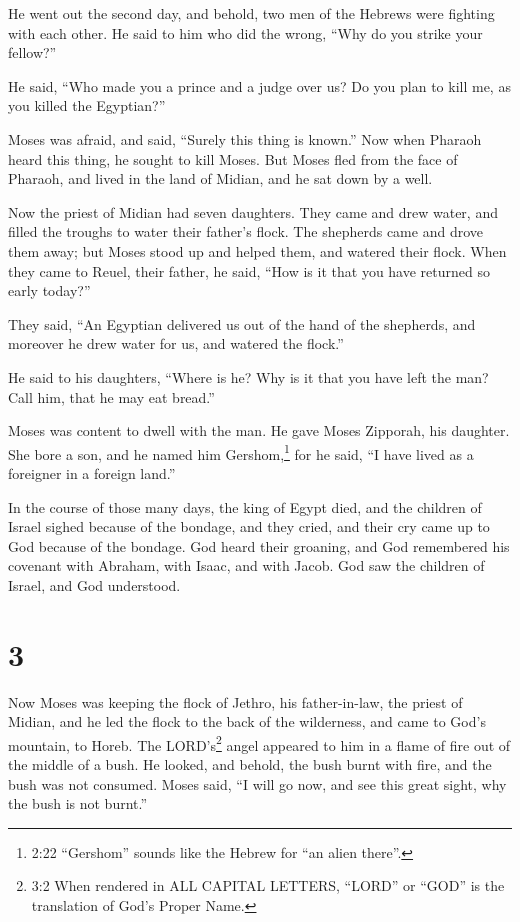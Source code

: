  He went out the second day, and behold, two men of the
Hebrews were fighting with each other. He said to him who did the wrong,
``Why do you strike your fellow?''

 He said, ``Who made you a prince and a judge over us? Do
you plan to kill me, as you killed the Egyptian?''

Moses was afraid, and said, ``Surely this thing is known.''
 Now when Pharaoh heard this thing, he sought to kill
Moses. But Moses fled from the face of Pharaoh, and lived in the land of
Midian, and he sat down by a well.

 Now the priest of Midian had seven daughters. They came
and drew water, and filled the troughs to water their father's flock.
 The shepherds came and drove them away; but Moses stood up
and helped them, and watered their flock.  When they came
to Reuel, their father, he said, ``How is it that you have returned so
early today?''

 They said, ``An Egyptian delivered us out of the hand of
the shepherds, and moreover he drew water for us, and watered the
flock.''

 He said to his daughters, ``Where is he? Why is it that
you have left the man? Call him, that he may eat bread.''

 Moses was content to dwell with the man. He gave Moses
Zipporah, his daughter.  She bore a son, and he named him
Gershom,\footnote{2:22 ``Gershom'' sounds like the Hebrew for ``an alien
  there''.} for he said, ``I have lived as a foreigner in a foreign
land.''

 In the course of those many days, the king of Egypt died,
and the children of Israel sighed because of the bondage, and they
cried, and their cry came up to God because of the bondage.
 God heard their groaning, and God remembered his covenant
with Abraham, with Isaac, and with Jacob.  God saw the
children of Israel, and God understood.

\hypertarget{section-2}{%
\section{3}\label{section-2}}

 Now Moses was keeping the flock of Jethro, his
father-in-law, the priest of Midian, and he led the flock to the back of
the wilderness, and came to God's mountain, to Horeb.  The
LORD's\footnote{3:2 When rendered in ALL CAPITAL LETTERS, ``LORD'' or
  ``GOD'' is the translation of God's Proper Name.} angel appeared to
him in a flame of fire out of the middle of a bush. He looked, and
behold, the bush burnt with fire, and the bush was not consumed.
 Moses said, ``I will go now, and see this great sight, why
the bush is not burnt.''

